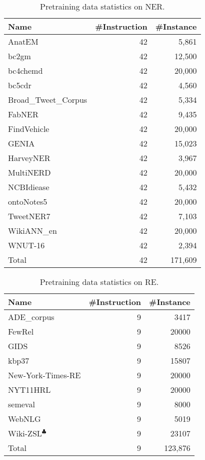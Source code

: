 \begin{table}
    \centering
    \begin{tabular}[]{lrr}
        \toprule
        Name & \#Instruction & \#Instance \\
        \midrule
        AnatEM & 42 & 5,861 \\
        bc2gm & 42 & 12,500 \\
        bc4chemd & 42 & 20,000 \\
        bc5cdr & 42 & 4,560 \\
        Broad\_Tweet\_Corpus & 42 & 5,334 \\
        FabNER & 42 & 9,435 \\
        FindVehicle & 42 & 20,000 \\
        GENIA & 42 & 15,023 \\
        HarveyNER & 42 & 3,967 \\
        MultiNERD & 42 & 20,000 \\
        NCBIdiease & 42 & 5,432 \\
        ontoNotes5 & 42 & 20,000 \\
        TweetNER7 & 42 & 7,103 \\
        WikiANN\_en & 42 & 20,000 \\
        WNUT-16 & 42 & 2,394 \\
        \midrule
        Total & 42 & 171,609 \\
        \bottomrule
    \end{tabular}
    \caption{
        Pretraining data statistics on NER.
    }
    \label{tab:data-statistics-ner}
\end{table}

\begin{table}
    \centering
    \begin{tabular}[]{lrr}
        \toprule
        Name & \#Instruction & \#Instance \\
        \midrule
        ADE\_corpus &  9 & 3417 \\
        FewRel &  9 & 20000 \\
        GIDS &  9 & 8526 \\
        kbp37 &  9 & 15807 \\
        New-York-Times-RE &  9 & 20000 \\
        NYT11HRL &  9 & 20000 \\
        semeval &  9 & 8000 \\
        WebNLG &  9 & 5019 \\
        Wiki-ZSL$^{\clubsuit}$ &  9 & 23107 \\
        \midrule
        Total & 9 & 123,876 \\
        \bottomrule
    \end{tabular}
    \caption{
        Pretraining data statistics on RE.
    }
    \label{tab:data-statistics-re}
\end{table}


